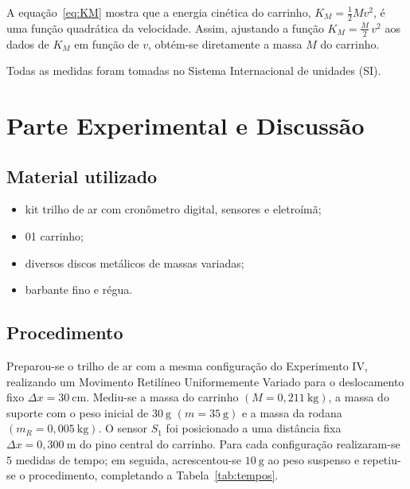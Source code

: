 \documentclass[12pt,a4paper]{article}
\begin{document}
A equação~\eqref{eq:KM} mostra que a energia cinética do carrinho, $K_M = \tfrac{1}{2}Mv^2$,
é uma função quadrática da velocidade. Assim, ajustando a função $K_M = \tfrac{M}{2}\,v^2$ aos
dados de $K_M$ em função de $v$, obtém-se diretamente a massa $M$ do carrinho.

Todas as medidas foram tomadas no Sistema Internacional de unidades (SI).


\section{Parte Experimental e Discussão}

\subsection{Material utilizado}
\begin{itemize}
	\item kit trilho de ar com cronômetro digital, sensores e eletroímã;
	\item 01 carrinho;
	\item diversos discos metálicos de massas variadas;
	\item barbante fino e régua.
\end{itemize}

\subsection{Procedimento}
Preparou-se o trilho de ar com a mesma configuração do Experimento IV, realizando um Movimento
Retilíneo Uniformemente Variado para o deslocamento fixo $\Delta x = 30~\mathrm{cm}$. Mediu-se a
massa do carrinho $(M = 0{,}211~\mathrm{kg})$, a massa do suporte com o peso inicial de
$30~\mathrm{g}$ $(m = 35~\mathrm{g})$ e a massa da rodana $(m_R = 0{,}005~\mathrm{kg})$. O sensor
$S_1$ foi posicionado a uma distância fixa $\Delta x = 0{,}300~\mathrm{m}$ do pino central do
carrinho. Para cada configuração realizaram-se $5$ medidas de tempo; em seguida, acrescentou-se
$10~\mathrm{g}$ ao peso suspenso e repetiu-se o procedimento, completando a
Tabela~\ref{tab:tempos}.
\end{document}

